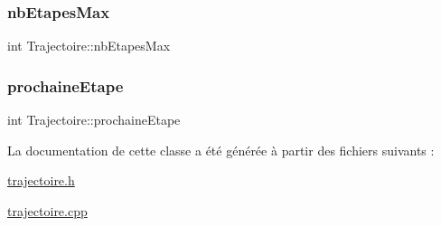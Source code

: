 \subsubsection{\texorpdfstring{nb\+Etapes\+Max}{nbEtapesMax}}
{\footnotesize\ttfamily int Trajectoire\+::nb\+Etapes\+Max\hspace{0.3cm}{\ttfamily [private]}}

\mbox{\label{class_trajectoire_a56fb38e337100dcbc3c49727d8f68c6a}} 
\subsubsection{\texorpdfstring{prochaine\+Etape}{prochaineEtape}}
{\footnotesize\ttfamily int Trajectoire\+::prochaine\+Etape\hspace{0.3cm}{\ttfamily [private]}}



La documentation de cette classe a été générée à partir des fichiers suivants \+:\begin{DoxyCompactItemize}
\item 
\hyperlink{trajectoire_8h}{trajectoire.\+h}\item 
\hyperlink{trajectoire_8cpp}{trajectoire.\+cpp}\end{DoxyCompactItemize}

